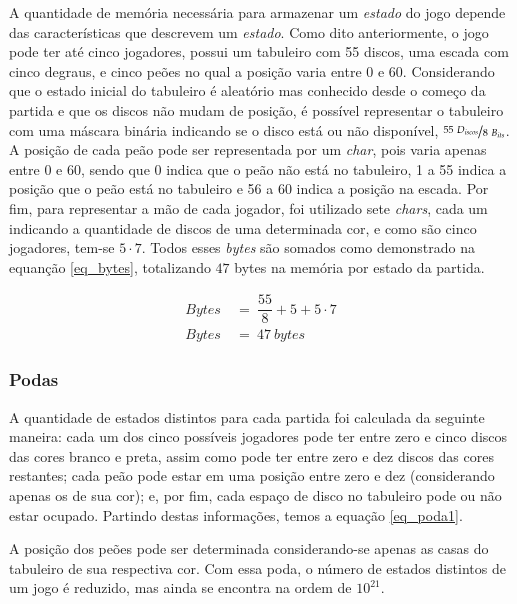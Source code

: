 A quantidade de memória necessária para armazenar um \emph{estado} do jogo depende das características que descrevem um \emph{estado}. Como dito anteriormente, o jogo pode ter até cinco jogadores, possui um tabuleiro com 55 discos, uma escada com cinco degraus, e cinco peões no qual a posição varia entre 0 e 60. Considerando que o estado inicial do tabuleiro é aleatório mas conhecido desde o começo da partida e que os discos não mudam de posição, é possível representar o tabuleiro com uma máscara binária indicando se o disco está ou não disponível, $\nicefrac{55\ D_{iscos}}{8\ B_{its}}$. A posição de cada peão pode ser representada por um \emph{char}, pois varia apenas entre 0 e 60, sendo que 0 indica que o peão não está no tabuleiro, 1 a 55 indica a posição que o peão está no tabuleiro e 56 a 60 indica a posição na escada. Por fim, para representar a mão de cada jogador, foi utilizado sete \emph{chars}, cada um indicando a quantidade de discos de uma determinada cor, e como são cinco jogadores, tem-se $5\cdot 7$. Todos esses \emph{bytes} são somados como demonstrado na equanção \ref{eq_bytes}, totalizando $47$ bytes na memória por estado da partida.

\begin{equation} \label{eq_bytes} \tag{e.q. Bytes na memória}
\begin{split}
Bytes\ &=\ \dfrac{55}{8} + 5 + 5\cdot 7\\
Bytes\ &=\ 47\ bytes
\end{split}
\end{equation}

\subsubsection{Podas}

A quantidade de estados distintos para cada partida foi calculada da seguinte maneira: cada um dos cinco possíveis jogadores pode ter entre zero e cinco discos das cores branco e preta, assim como pode ter entre zero e dez discos das cores restantes; cada peão pode estar em uma posição entre zero e dez (considerando apenas os de sua cor); e, por fim, cada espaço de disco no tabuleiro pode ou não estar ocupado. Partindo destas informações, temos a equação \ref{eq_poda1}.

A posição dos peões pode ser determinada considerando-se apenas as casas do
tabuleiro de sua respectiva cor. Com essa poda, o número de estados distintos
de um jogo é reduzido, mas ainda se encontra na ordem de $10^{21}$.

